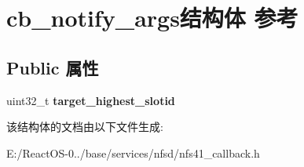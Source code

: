 \hypertarget{structcb__notify__args}{}\section{cb\+\_\+notify\+\_\+args结构体 参考}
\label{structcb__notify__args}
\subsection*{Public 属性}
\begin{DoxyCompactItemize}
\item 
\mbox{\label{structcb__notify__args_abaf727197f9531c6d1e53aecbc764992}} 
uint32\+\_\+t {\bfseries target\+\_\+highest\+\_\+slotid}
\end{DoxyCompactItemize}


该结构体的文档由以下文件生成\+:\begin{DoxyCompactItemize}
\item 
E\+:/\+React\+O\+S-\/0../base/services/nfsd/nfs41\+\_\+callback.\+h\end{DoxyCompactItemize}
